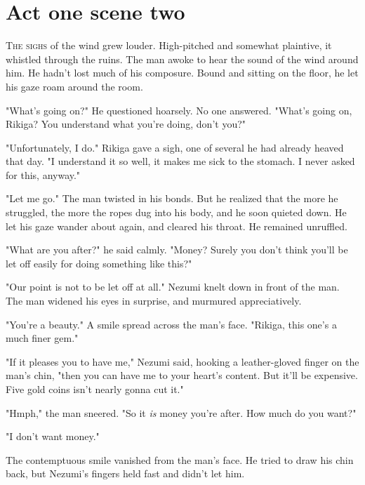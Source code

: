 
\chapter{Act one scene two}


\lettrine{T}{he sighs} of the wind grew louder. High-pitched and somewhat plaintive,
it whistled through the ruins. The man awoke to hear the sound of the
wind around him. He hadn't lost much of his composure. Bound and sitting
on the floor, he let his gaze roam around the room.

"What's going on?" He questioned hoarsely. No one answered. "What's
going on, Rikiga? You understand what you're doing, don't you?"

"Unfortunately, I do." Rikiga gave a sigh, one of several he had already
heaved that day. "I understand it so well, it makes me sick to the
stomach. I never asked for this, anyway."

"Let me go." The man twisted in his bonds. But he realized that the more
he struggled, the more the ropes dug into his body, and he soon quieted
down. He let his gaze wander about again, and cleared his throat. He
remained unruffled.

"What are you after?" he said calmly. "Money? Surely you don't think
you'll be let off easily for doing something like this?"

"Our point is not to be let off at all." Nezumi knelt down in front of
the man. The man widened his eyes in surprise, and murmured
appreciatively.

"You're a beauty." A smile spread across the man's face. "Rikiga, this
one's a much finer gem."

"If it pleases you to have me," Nezumi said, hooking a leather-gloved
finger on the man's chin, "then you can have me to your heart's content.
But it'll be expensive. Five gold coins isn't nearly gonna cut it."

"Hmph," the man sneered. "So it \emph{is} money you're after. How much do you
want?"

"I don't want money."

The contemptuous smile vanished from the man's face. He tried to draw
his chin back, but Nezumi's fingers held fast and didn't let him.

